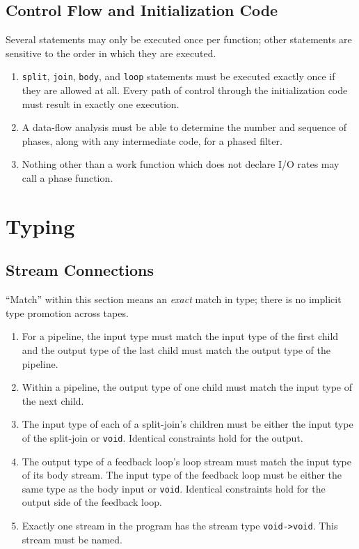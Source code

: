 \documentclass[11pt]{article}
\begin{document}
\subsection{Control Flow and Initialization Code}

Several statements may only be executed once per function; other
statements are sensitive to the order in which they are executed.

\begin{enumerate}
\item \lstinline|split|, \lstinline|join|, \lstinline|body|, and
  \lstinline|loop| statements must be executed exactly once if they
  are allowed at all.  Every path of control through the
  initialization code must result in exactly one execution.
\item A data-flow analysis must be able to determine the number and
  sequence of phases, along with any intermediate code, for a phased
  filter.
\item Nothing other than a work function which does not declare I/O
  rates may call a phase function.
\end{enumerate}

\section{Typing}

\subsection{Stream Connections}

``Match'' within this section means an \emph{exact} match in type;
there is no implicit type promotion across tapes.

\begin{enumerate}
\item For a pipeline, the input type must match the input type of the
  first child and the output type of the last child must match the
  output type of the pipeline.
\item Within a pipeline, the output type of one child must match the
  input type of the next child.
\item The input type of each of a split-join's children must be either
  the input type of the split-join or \lstinline|void|.  Identical
  constraints hold for the output.
\item The output type of a feedback loop's loop stream must match the
  input type of its body stream.  The input type of the feedback loop
  must be either the same type as the body input or \lstinline|void|.
  Identical constraints hold for the output side of the feedback loop.
\item Exactly one stream in the program has the stream type
  \lstinline|void->void|.  This stream must be named.
\end{enumerate}
\end{document}
